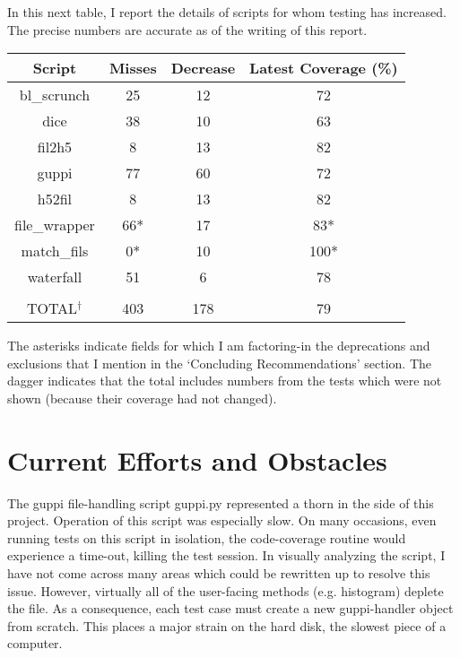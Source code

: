 \documentclass[12pt]{article}
\begin{document}
In this next table, I report the details of scripts for whom testing has increased. The precise numbers are accurate as of the writing of this report.

\begin{center}
 \begin{tabular}{||c c c c||} 
 \hline
 Script & Misses & Decrease & Latest Coverage (\%)\\ [0.5ex] 
\hline
bl\_scrunch & 25 & 12 & 72 \\
\hline
dice & 38 & 10 & 63 \\
\hline
fil2h5 & 8 & 13 & 82 \\
\hline
guppi & 77 & 60 & 72 \\
\hline
h52fil & 8 & 13 & 82 \\
\hline
file\_wrapper & 66* & 17 & 83* \\
\hline
match\_fils & 0* & 10 & 100* \\
\hline
waterfall & 51 & 6 & 78 \\
\hline
&&&
\\
\hline
TOTAL$^\dagger$ & 403 & 178 & 79 \\ [1ex] 
\hline
\end{tabular}
\end{center}

The asterisks indicate fields for which I am factoring-in the deprecations and exclusions that I mention in the `Concluding Recommendations' section. The dagger indicates that the total includes numbers from the tests which were not shown (because their coverage had not changed).


\section{Current Efforts and Obstacles}

\quad \quad The guppi file-handling script guppi.py represented a thorn in the side of this project. Operation of this script was especially slow. On many occasions, even running tests on this script in isolation, the code-coverage routine would experience a time-out, killing the test session. In visually analyzing the script, I have not come across many areas which could be rewritten up to resolve this issue. However, virtually all of the user-facing methods (e.g. histogram) deplete the file. As a consequence, each test case must create a new guppi-handler object from scratch. This places a major strain on the hard disk, the slowest piece of a computer.
\end{document}
